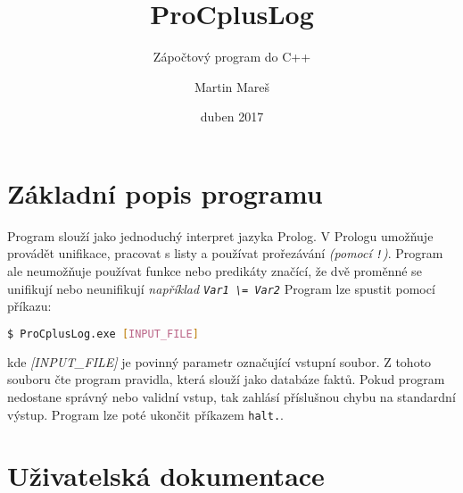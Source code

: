 \documentclass[12pt,a4paper,titlepage]{scrartcl}
\title{ProCplusLog}
\subtitle{Zápočtový program do C++}
\author{Martin Mareš}
\date{duben 2017}
\begin{document}
	\maketitle
	\section{Základní popis programu}
	Program slouží jako jednoduchý interpret jazyka Prolog. V Prologu umožňuje provádět unifikace, pracovat s listy a používat prořezávání \textit{(pomocí \texttt{!})}. Program ale neumožňuje používat funkce nebo predikáty značící, že dvě proměnné se unifikují nebo neunifikují \textit{například \texttt{Var1 \textbackslash= Var2}} Program lze spustit pomocí příkazu:
	\begin{lstlisting}[language=bash]
  		$ ProCplusLog.exe [INPUT_FILE]
	\end{lstlisting} 
	kde \textit{[INPUT\_FILE]} je povinný parametr označující vstupní soubor. Z tohoto souboru čte program pravidla, která slouží jako databáze faktů. Pokud program nedostane správný nebo validní vstup, tak zahlásí příslušnou chybu na standardní výstup. Program lze poté ukončit příkazem \texttt{halt.}.
	
	\section{Uživatelská dokumentace}
	
\end{document}
